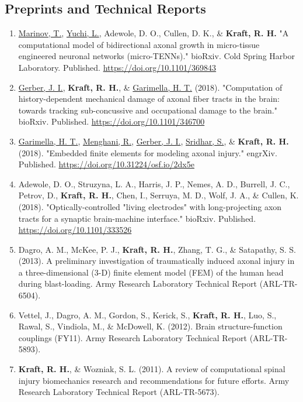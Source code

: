 \documentclass[a4paper,10pt]{article}
\begin{document}
    \subsection*{Preprints and Technical Reports}
    \begin{enumerate}
      \item \underline{Marinov, T.}, \underline{Yuchi, L.}, Adewole, D. O., Cullen, D. K., \&
 \textbf{\textbf{Kraft,} R. H.} "A computational model of bidirectional axonal growth in micro-tissue engineered neuronal networks (micro-TENNs)." bioRxiv. Cold Spring Harbor Laboratory. Published. \url{https://doi.org/10.1101/369843}
  \item \underline{Gerber, J. I.}, \textbf{\textbf{Kraft,} R. H.}, \&
 \underline{Garimella, H. T.} (2018). "Computation of history-dependent mechanical damage of axonal fiber tracts in the brain: towards tracking sub-concussive and occupational damage to the brain." bioRxiv. Published. \url{https://doi.org/10.1101/346700}
  \item \underline{Garimella, H. T.}, \underline{Menghani, R.}, \underline{Gerber, J. I.}, \underline{Sridhar, S.}, \&
 \textbf{\textbf{Kraft,} R. H.} (2018). "Embedded finite elements for modeling axonal injury." engrXiv. Published. \url{https://doi.org/10.31224/osf.io/2dx5e}
  \item Adewole, D. O., Struzyna, L. A., Harris, J. P., Nemes, A. D., Burrell, J. C., Petrov, D., \textbf{\textbf{Kraft,} R. H.}, Chen, I., Serruya, M. D., Wolf, J. A., \&
 Cullen, K. (2018). "Optically-controlled "living electrodes" with long-projecting axon tracts for a synaptic brain-machine interface." bioRxiv. Published. \url{https://doi.org/10.1101/333526}
  \item Dagro, A. M., McKee, P. J., \textbf{\textbf{Kraft,} R. H.}, Zhang, T. G., \&
 Satapathy, S. S. (2013). A preliminary investigation of traumatically induced axonal injury in a three-dimensional (3-D) finite element model (FEM) of the human head during blast-loading. Army Research Laboratory Technical Report (ARL-TR-6504).
  \item Vettel, J., Dagro, A. M., Gordon, S., Kerick, S., \textbf{\textbf{Kraft,} R. H.}, Luo, S., Rawal, S., Vindiola, M., \&
 McDowell, K. (2012). Brain structure-function couplings (FY11). Army Research Laboratory Technical Report (ARL-TR-5893).
  \item \textbf{\textbf{Kraft,} R. H.}, \&
 Wozniak, S. L. (2011). A review of computational spinal injury biomechanics research and recommendations for future efforts. Army Research Laboratory Technical Report (ARL-TR-5673).

\end{enumerate}
\end{document}
